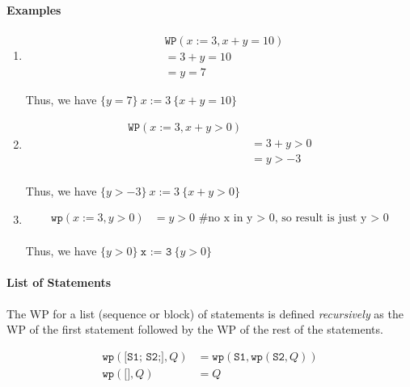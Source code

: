 \documentclass[oneside,11pt,dvipsnames]{book}
\newcommand{\code}[1]{\texttt{#1}}
\begin{document}
\paragraph{Examples}
\begin{enumerate}
\item      
\begin{equation*}
    \begin{split}
        &\code{WP}(x:=3, x + y = 10) \\
        &= 3 + y = 10\\ 
        &= y = 7
    \end{split}
\end{equation*}

Thus, we have $\{y=7\} ~x := 3~ \{x + y = 10\}$

\item 
\begin{equation*}
    \begin{split}
        \code{WP}(x:=3, x + y > 0) \\
        &= 3 + y > 0  \\
        &= y > -3\\
    \end{split}
\end{equation*}


Thus, we have $\{y > -3\}  ~x := 3~ \{x + y> 0\}$

\item 
\begin{equation*}
    \begin{split}
        \code{wp}(x:=3, y > 0) &= y > 0 \text{ \# no x in y > 0, so result is just y > 0}\\
    \end{split}    
\end{equation*}

Thus, we have $\{y > 0\}  ~\code{x := 3}~ \{y > 0\}$
\end{enumerate}


\paragraph{List of Statements}\label{list-of-statements}

The WP for a list (sequence or block) of statements is defined \emph{recursively} as the WP of the first statement followed by the WP of the rest of the statements.  

\begin{align}\label{eq:wp-sequence}
    \code{wp}(\code{[S1; S2;]}, Q) &= \code{wp}(\code{S1}, \code{wp}(\code{S2}, Q))\\
    \code{wp}(\code{[]}, Q) &= Q
\end{align}
\end{document}
